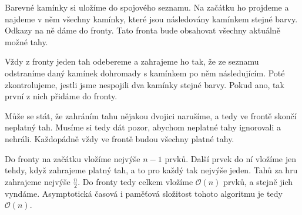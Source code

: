 \documentclass{article}
\begin{document}
Barevné kamínky si uložíme do spojového seznamu. Na začátku ho projdeme a najdeme v něm všechny kamínky, které jsou následovány kamínkem stejné barvy. Odkazy na ně dáme do fronty. Tato fronta bude obsahovat všechny aktuálně možné tahy.

Vždy z fronty jeden tah odebereme a zahrajeme ho tak, že ze seznamu odstraníme daný kamínek dohromady s kamínkem po něm následujícím. Poté zkontrolujeme, jestli jsme nespojili dva kamínky stejné barvy. Pokud ano, tak první z nich přidáme do fronty.

Může se stát, že zahráním tahu nějakou dvojici narušíme, a tedy ve frontě skončí neplatný tah. Musíme si tedy dát pozor, abychom neplatné tahy ignorovali a nehráli. Každopádně vždy ve frontě budou všechny platné tahy.

Do fronty na začátku vložíme nejvýše $n - 1$ prvků. Další prvek do ní vložíme jen tehdy, když zahrajeme platný tah, a to pro každý tak nejvýše jeden. Tahů za hru zahrajeme nejvýše $\frac{n}{2}$. Do fronty tedy celkem vložíme $\mathcal{O}\left(n\right)$ prvků, a stejně jich vyndáme. Asymptotická časová i paměťová složitost tohoto algoritmu je tedy $\mathcal{O}\left(n\right)$.
\end{document}
